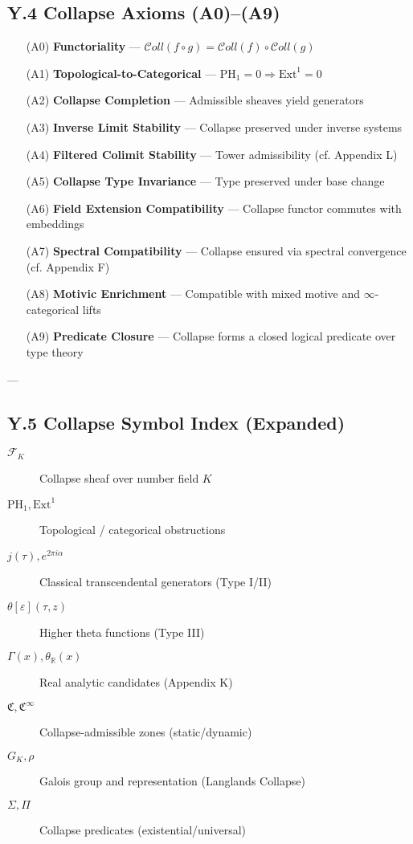 \documentclass[11pt]{article}
\begin{document}
\subsection*{Y.4 Collapse Axioms (A0)–(A9)}

\begin{itemize}
  \item[(A0)] \textbf{Functoriality} — \( \mathcal{C}oll(f \circ g) = \mathcal{C}oll(f) \circ \mathcal{C}oll(g) \)
  \item[(A1)] \textbf{Topological-to-Categorical} — \( \mathrm{PH}_1 = 0 \Rightarrow \mathrm{Ext}^1 = 0 \)
  \item[(A2)] \textbf{Collapse Completion} — Admissible sheaves yield generators
  \item[(A3)] \textbf{Inverse Limit Stability} — Collapse preserved under inverse systems
  \item[(A4)] \textbf{Filtered Colimit Stability} — Tower admissibility (cf. Appendix L)
  \item[(A5)] \textbf{Collapse Type Invariance} — Type preserved under base change
  \item[(A6)] \textbf{Field Extension Compatibility} — Collapse functor commutes with embeddings
  \item[(A7)] \textbf{Spectral Compatibility} — Collapse ensured via spectral convergence (cf. Appendix F)
  \item[(A8)] \textbf{Motivic Enrichment} — Compatible with mixed motive and \( \infty \)-categorical lifts
  \item[(A9)] \textbf{Predicate Closure} — Collapse forms a closed logical predicate over type theory
\end{itemize}

---

\subsection*{Y.5 Collapse Symbol Index (Expanded)}

\begin{description}
  \item[$\mathcal{F}_K$] Collapse sheaf over number field $K$
  \item[$\mathrm{PH}_1, \mathrm{Ext}^1$] Topological / categorical obstructions
  \item[$j(\tau), e^{2\pi i\alpha}$] Classical transcendental generators (Type I/II)
  \item[\mbox{$\theta[\varepsilon](\tau, z)$}] Higher theta functions (Type III)
  \item[$\Gamma(x), \theta_{\mathbb{R}}(x)$] Real analytic candidates (Appendix K)
  \item[$\mathfrak{C}, \mathfrak{C}^\infty$] Collapse-admissible zones (static/dynamic)
  \item[$G_K, \rho$] Galois group and representation (Langlands Collapse)
  \item[$\Sigma, \Pi$] Collapse predicates (existential/universal)
\end{description}
\end{document}
